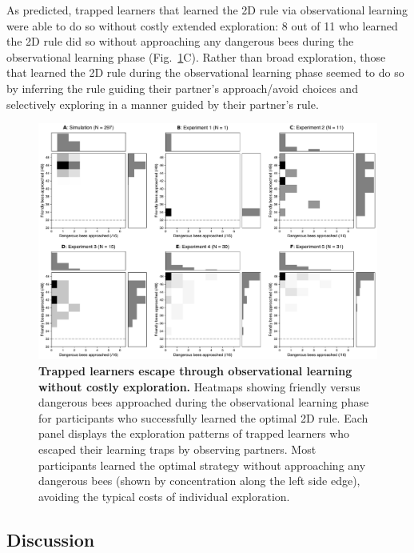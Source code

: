 \documentclass[11pt]{article} %
\begin{document}
As predicted, trapped learners that learned the 2D rule via observational learning were able to do so without costly extended exploration: 8 out of 11 who learned the 2D rule did so without approaching any dangerous bees during the observational learning phase (Fig.~\ref{fig:trapped-to-optimal-heatmaps}C). Rather than broad exploration, those that learned the 2D rule during the observational learning phase seemed to do so by inferring the rule guiding their partner's approach/avoid choices and selectively exploring in a manner guided by their partner's rule.  

\begin{figure}
    \centering
    \includegraphics[width=1.0 \linewidth]{trapped_to_optimal_grid.pdf}
    \caption{\textbf{Trapped learners escape through observational learning without costly exploration.} Heatmaps showing friendly versus dangerous bees approached during the observational learning phase for participants who successfully learned the optimal 2D rule. Each panel displays the exploration patterns of trapped learners who escaped their learning traps by observing partners. Most participants learned the optimal strategy without approaching any dangerous bees (shown by concentration along the left side edge), avoiding the typical costs of individual exploration.}
    \label{fig:trapped-to-optimal-heatmaps}
\end{figure}

\subsection{Discussion}
\end{document}
